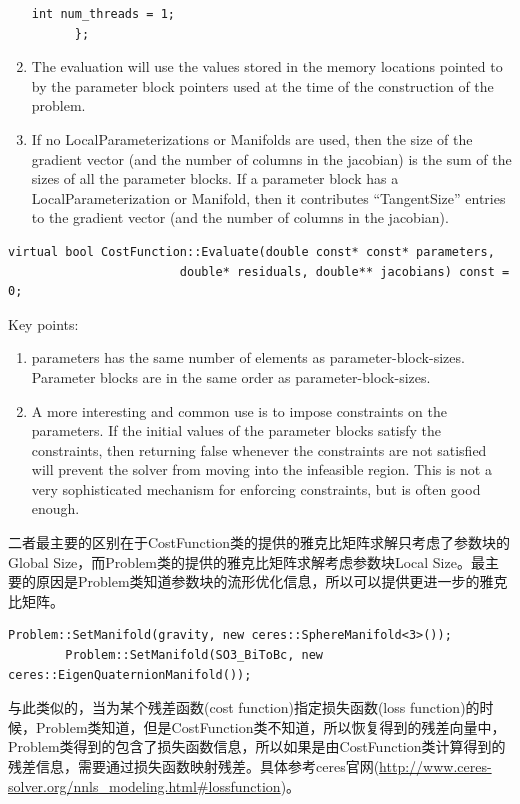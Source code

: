 \documentclass[12pt, onecolumn]{article}
\newcommand\normf{\fangsong}
\begin{document}
\begin{enumerate}
\begin{lstlisting}[caption=EvaluateOptions]
	    int num_threads = 1;
	  };
	\end{lstlisting}
	
	\item The evaluation will use the values stored in the memory locations
	pointed to by the parameter block pointers used at the time of the
	construction of the problem.
	
	\item If no LocalParameterizations or Manifolds are used, then the size
	of the gradient vector (and the number of columns in the jacobian) is the
	sum of the sizes of all the parameter blocks. If a parameter block has a
	LocalParameterization or Manifold, then it contributes “TangentSize”
	entries to the gradient vector (and the number of columns in the jacobian).
	\end{enumerate}
	
	\begin{lstlisting}[caption=\normf{CostFunction类的提供的雅克比矩阵求解}]
  virtual bool CostFunction::Evaluate(double const* const* parameters,
                        double* residuals, double** jacobians) const = 0;
	\end{lstlisting}
	Key points:
	\begin{enumerate}
	\item parameters has the same number of
	elements as parameter-block-sizes.  Parameter blocks are in the
	same order as parameter-block-sizes.
	
	\item A more interesting and common use is to impose constraints on the
	parameters. If the initial values of the parameter blocks satisfy
	the constraints, then returning false whenever the constraints
	are not satisfied will prevent the solver from moving into the
	infeasible region. This is not a very sophisticated mechanism for
	enforcing constraints, but is often good enough.
	\end{enumerate}
	
	二者最主要的区别在于CostFunction类的提供的雅克比矩阵求解只考虑了参数块的Global Size，而Problem类的提供的雅克比矩阵求解考虑参数块Local Size。最主要的原因是Problem类知道参数块的流形优化信息，所以可以提供更进一步的雅克比矩阵。
	\begin{lstlisting}[caption=\normf{流形优化}]
        Problem::SetManifold(gravity, new ceres::SphereManifold<3>());
        Problem::SetManifold(SO3_BiToBc, new ceres::EigenQuaternionManifold());
	\end{lstlisting}
	
	与此类似的，当为某个残差函数(cost function)指定损失函数(loss function)的时候，Problem类知道，但是CostFunction类不知道，所以恢复得到的残差向量中，Problem类得到的包含了损失函数信息，所以如果是由CostFunction类计算得到的残差信息，需要通过损失函数映射残差。具体参考ceres官网(\url{http://www.ceres-solver.org/nnls_modeling.html#lossfunction})。
	
\end{document}

